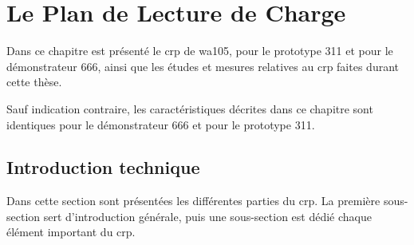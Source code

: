 \chapter{Le Plan de Lecture de Charge}
    
    Dans ce chapitre est présenté le \gls{crp} de \gls{wa105}, pour le prototype 311 et pour le démonstrateur 666, ainsi que les études et mesures relatives au \gls{crp} faites durant cette thèse.
    
    Sauf indication contraire, les caractéristiques décrites dans ce chapitre sont identiques pour le démonstrateur 666 et pour le prototype 311.
    
    
    \section{Introduction technique}
        
        Dans cette section sont présentées les différentes parties du \gls{crp}. La première sous-section sert d'introduction générale, puis une sous-section est dédié chaque élément important du \gls{crp}.
        
